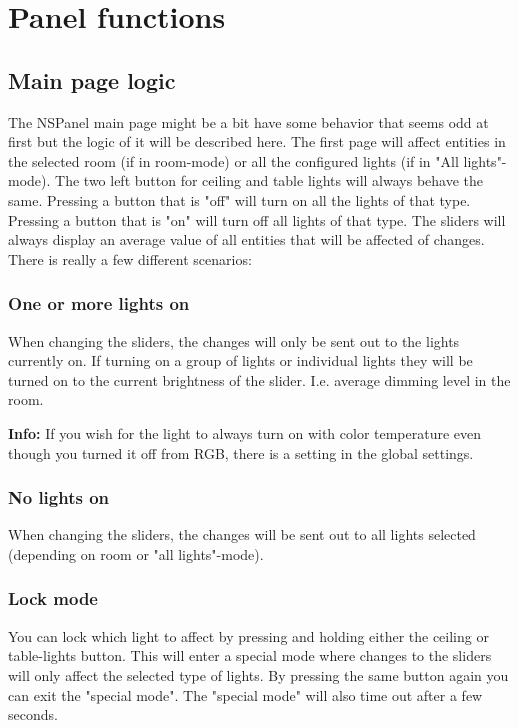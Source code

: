\documentclass[10pt]{article}
\newcommand{\info}[1]{\begin{infoBox} \textbf{Info:} #1 \end{infoBox}}
\begin{document}
    \clearpage
    \section{Panel functions}
    \subsection{Main page logic}
    The NSPanel main page might be a bit have some behavior that seems odd at first but the logic of it will be described here. The first page will affect entities in the selected room (if in room-mode) or all the configured lights (if in "All lights"-mode). The two left button for ceiling and table lights will always behave the same. Pressing a button that is "off" will turn on all the lights of that type. Pressing a button that is "on" will turn off all lights of that type. The sliders will always display an average value of all entities that will be affected of changes. There is really a few different scenarios:
    \subsubsection{One or more lights on}
    When changing the sliders, the changes will only be sent out to the lights currently on.
    If turning on a group of lights or individual lights they will be turned on to the current brightness of the slider. I.e. average dimming level in the room.
    \info{If you wish for the light to always turn on with color temperature even though you turned it off from RGB, there is a setting in the global settings.}
    \subsubsection{No lights on}
    When changing the sliders, the changes will be sent out to all lights selected (depending on room or "all lights"-mode).
    \subsubsection{Lock mode}
    You can lock which light to affect by pressing and holding either the ceiling or table-lights button. This will enter a special mode where changes to the sliders will only affect the selected type of lights. By pressing the same button again you can exit the "special mode". The "special mode" will also time out after a few seconds.

    \clearpage
\end{document}

